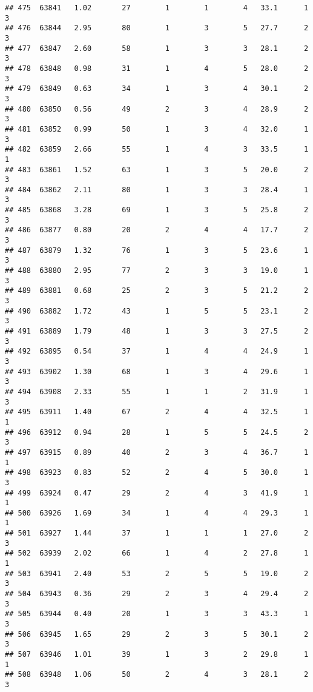 \documentclass[
]{article}
\begin{document}
\begin{verbatim}
## 475  63841   1.02       27        1        1        4   33.1      1      3
## 476  63844   2.95       80        1        3        5   27.7      2      3
## 477  63847   2.60       58        1        3        3   28.1      2      3
## 478  63848   0.98       31        1        4        5   28.0      2      3
## 479  63849   0.63       34        1        3        4   30.1      2      3
## 480  63850   0.56       49        2        3        4   28.9      2      3
## 481  63852   0.99       50        1        3        4   32.0      1      3
## 482  63859   2.66       55        1        4        3   33.5      1      1
## 483  63861   1.52       63        1        3        5   20.0      2      3
## 484  63862   2.11       80        1        3        3   28.4      1      3
## 485  63868   3.28       69        1        3        5   25.8      2      3
## 486  63877   0.80       20        2        4        4   17.7      2      3
## 487  63879   1.32       76        1        3        5   23.6      1      3
## 488  63880   2.95       77        2        3        3   19.0      1      3
## 489  63881   0.68       25        2        3        5   21.2      2      3
## 490  63882   1.72       43        1        5        5   23.1      2      3
## 491  63889   1.79       48        1        3        3   27.5      2      3
## 492  63895   0.54       37        1        4        4   24.9      1      3
## 493  63902   1.30       68        1        3        4   29.6      1      3
## 494  63908   2.33       55        1        1        2   31.9      1      3
## 495  63911   1.40       67        2        4        4   32.5      1      1
## 496  63912   0.94       28        1        5        5   24.5      2      3
## 497  63915   0.89       40        2        3        4   36.7      1      1
## 498  63923   0.83       52        2        4        5   30.0      1      3
## 499  63924   0.47       29        2        4        3   41.9      1      1
## 500  63926   1.69       34        1        4        4   29.3      1      1
## 501  63927   1.44       37        1        1        1   27.0      2      3
## 502  63939   2.02       66        1        4        2   27.8      1      1
## 503  63941   2.40       53        2        5        5   19.0      2      3
## 504  63943   0.36       29        2        3        4   29.4      2      3
## 505  63944   0.40       20        1        3        3   43.3      1      3
## 506  63945   1.65       29        2        3        5   30.1      2      3
## 507  63946   1.01       39        1        3        2   29.8      1      1
## 508  63948   1.06       50        2        4        3   28.1      2      3

\end{verbatim}
\end{document}
